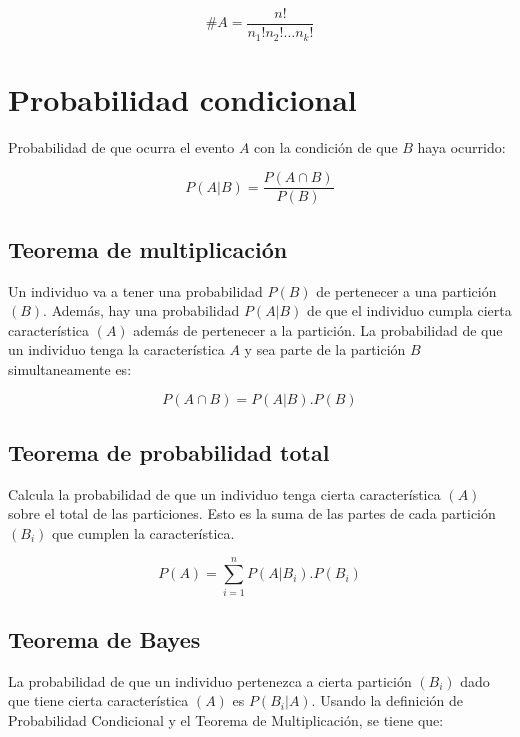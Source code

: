 \documentclass[a5paper,12pt,twoside]{book}
\begin{document}
\begin{equation}
\#A=\dfrac{n!}{n_1!n_2! \dots n_k!}
\end{equation}

\section{Probabilidad condicional}

Probabilidad de que ocurra el evento $A$ con la condición de que $B$ haya ocurrido:

\begin{equation}
P(A|B) = \dfrac{P(A \cap B)}{P(B)}
\end{equation}

\subsection{Teorema de multiplicación}

Un individuo va a tener una probabilidad $P(B)$ de pertenecer a una partición $(B)$. Además, hay una probabilidad $P(A|B)$ de que el individuo cumpla cierta característica $(A)$ además de pertenecer a la partición. La probabilidad de que un individuo tenga la característica $A$ y sea parte de la partición $B$ simultaneamente es:

\begin{equation}
P(A \cap B) = P(A|B) . P(B)
\end{equation}

\subsection{Teorema de probabilidad total}

Calcula la probabilidad de que un individuo tenga cierta característica $(A)$ sobre el total de las particiones. Esto es la suma de las partes de cada partición $(B_i)$ que cumplen la característica.

\begin{equation}
P(A) = \sum_{i=1}^n P(A|B_i) . P(B_i)
\end{equation}

\subsection{Teorema de Bayes}

La probabilidad de que un individuo pertenezca a cierta partición $(B_i)$ dado que tiene cierta característica $(A)$ es $P(B_i|A)$. Usando la definición de Probabilidad Condicional y el Teorema de Multiplicación, se tiene que:
\end{document}
